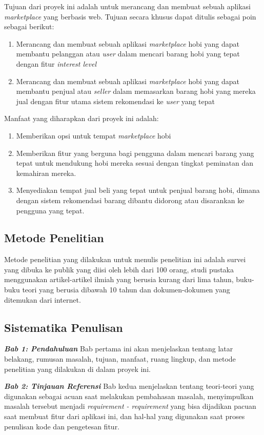 \documentclass[a4paper]{article}
\newcommand{\subbab}[1]{%
    \subsection{#1}%
    \setcounter{figure}{0}
    \setcounter{table}{0}
}
\begin{document}
Tujuan dari proyek ini adalah untuk merancang dan membuat sebuah aplikasi \textit{marketplace} yang berbasis web. Tujuan secara khusus dapat ditulis sebagai poin sebagai berikut:
\begin{enumerate}
    \item Merancang dan membuat sebuah aplikasi \textit{marketplace} hobi yang dapat membantu pelanggan atau \textit{user} dalam mencari barang hobi yang tepat dengan fitur \textit{interest level}
    \item Merancang dan membuat sebuah aplikasi \textit{marketplace} hobi yang dapat membantu penjual atau \textit{seller} dalam memasarkan barang hobi yang mereka jual dengan fitur utama sistem rekomendasi ke \textit{user} yang tepat
\end{enumerate}

Manfaat yang diharapkan dari proyek ini adalah:
\begin{enumerate}
    \item Memberikan opsi untuk tempat \textit{marketplace} hobi
    \item Memberikan fitur yang berguna bagi pengguna dalam mencari barang yang tepat untuk mendukung hobi mereka sesuai dengan tingkat peminatan dan kemahiran mereka.
    \item Menyediakan tempat jual beli yang tepat untuk penjual barang hobi, dimana dengan sistem rekomendasi barang dibantu didorong atau disarankan ke pengguna yang tepat.
\end{enumerate}

\subbab{Metode Penelitian}

Metode penelitian yang dilakukan untuk menulis penelitian ini adalah survei yang dibuka ke publik yang diisi oleh lebih dari 100 orang, studi pustaka menggunakan artikel-artikel ilmiah yang berusia kurang dari lima tahun, buku-buku teori yang berusia dibawah 10 tahun dan dokumen-dokumen yang ditemukan dari internet.

\subbab{Sistematika Penulisan}
\textit{\textbf{Bab 1: Pendahuluan}} \newline
Bab pertama ini akan menjelaskan tentang latar belakang, rumusan masalah, tujuan, manfaat, ruang lingkup, dan metode penelitian yang dilakukan di dalam proyek ini.

\textit{\textbf{Bab 2: Tinjauan Referensi}}\newline
Bab kedua menjelaskan tentang teori-teori yang digunakan sebagai acuan saat melakukan pembahasan masalah, menyimpulkan masalah tersebut menjadi \textit{requirement - requirement} yang bisa dijadikan pacuan saat membuat fitur dari aplikasi ini, dan hal-hal yang digunakan saat proses penulisan kode dan pengetesan fitur.
\end{document}
